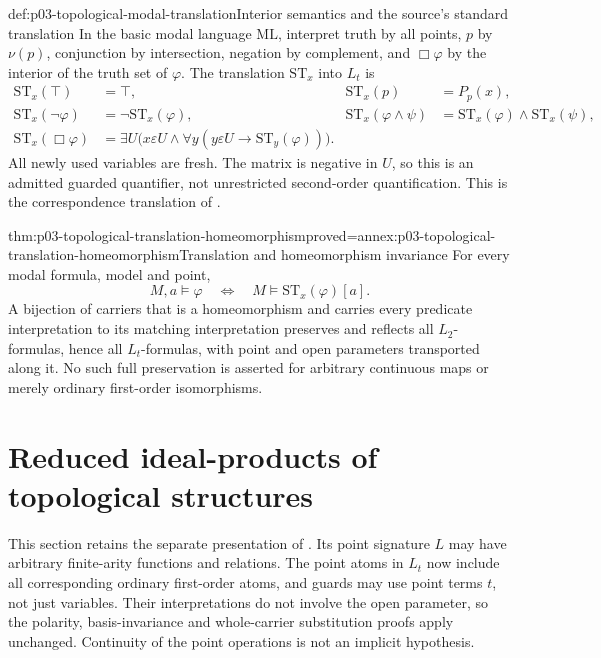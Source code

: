 \begin{hbdefinition}{def:p03-topological-modal-translation}{Interior semantics and the source's standard translation}
In the basic modal language \(\mathrm{ML}\), interpret truth by all
points, \(p\) by \(\nu(p)\), conjunction by intersection, negation
by complement, and \(\Box\varphi\) by the interior of the truth set of
\(\varphi\). The translation \(\mathrm{ST}_x\) into \(L_t\) is
\[
\begin{aligned}
 \mathrm{ST}_x(\top)&=\top,&
 \mathrm{ST}_x(p)&=P_p(x),\\
 \mathrm{ST}_x(\neg\varphi)&=\neg\mathrm{ST}_x(\varphi),&
 \mathrm{ST}_x(\varphi\land\psi)&=
                \mathrm{ST}_x(\varphi)\land\mathrm{ST}_x(\psi),\\
 \mathrm{ST}_x(\Box\varphi)&=
       \exists U\bigl(x\varepsilon U\land
              \forall y(y\varepsilon U\to\mathrm{ST}_y(\varphi))\bigr).
\end{aligned}
\]
All newly used variables are fresh. The matrix is negative in \(U\),
so this is an admitted guarded quantifier, not unrestricted second-order
quantification. This is the correspondence translation of
\cite[Definition~14 and Theorem~2.10, p.~12]{TenCateGabelaiaSustretov2006TopologyDraft}.
\end{hbdefinition}

\begin{hbtheorem}{thm:p03-topological-translation-homeomorphism}{proved=annex:p03-topological-translation-homeomorphism}{Translation and homeomorphism invariance}
For every modal formula, model and point,
\[
                   M,a\models\varphi
                 \quad\Longleftrightarrow\quad
                   M\models\mathrm{ST}_x(\varphi)[a].
\]
A bijection of carriers that is a homeomorphism and carries every predicate
interpretation to its matching interpretation preserves and reflects all
\(L_2\)-formulas, hence all \(L_t\)-formulas, with point and open
parameters transported along it. No such full preservation is asserted for
arbitrary continuous maps or merely ordinary first-order isomorphisms.
\end{hbtheorem}

\section{Reduced ideal-products of topological structures}
\label{sec:p03-topological-reduced-products}

This section retains the separate presentation of
\cite[pp.~1--7]{GrulovicKurilic2001TopologicalFV}. Its point signature
\(L\) may have arbitrary finite-arity functions and relations. The point
atoms in \(L_t\) now include all corresponding ordinary first-order
atoms, and guards may use point terms \(t\), not just variables.
Their interpretations do not involve the open parameter, so the polarity,
basis-invariance and whole-carrier substitution proofs apply unchanged.
Continuity of the point operations is not an implicit hypothesis.


